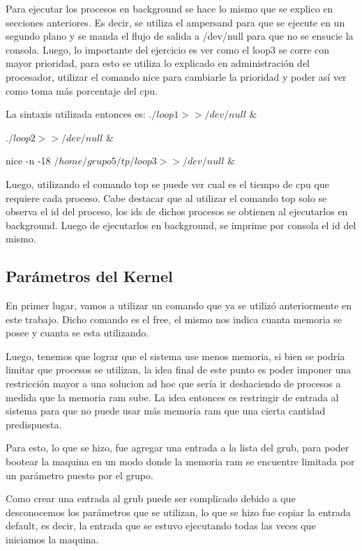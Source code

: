 \documentclass[a4paper, 12pt]{article}
\begin{document}
Para ejecutar los procesos en background se hace lo mismo que se explico en secciones anteriores. Es decir, se utiliza el ampersand para que se ejecute en un segundo plano y se manda el flujo de salida a /dev/null para que no se ensucie la consola. Luego, lo importante del ejercicio es ver como el loop3 se corre con mayor prioridad, para esto se utiliza lo explicado en administraci\'on del procesador, utilizar el comando nice para cambiarle la prioridad y poder as\'i ver como toma m\'as porcentaje del cpu.

La sintaxis utilizada entonces es:
$./loop1 >> /dev/null$ \&

$./loop2 >> /dev/null$ \&

nice -n -18 $/home/grupo5/tp/loop3 >> /dev/null$ \&


Luego, utilizando el comando top se puede ver cual es el tiempo de cpu que requiere cada proceso. Cabe destacar que al utilizar el comando top solo se observa el id del proceso, los ids de dichos procesos se obtienen al ejecutarlos en background. Luego de ejecutarlos en background, se imprime por consola el id del mismo.

\subsection*{Par\'ametros del Kernel}

En primer lugar, vamos a utilizar un comando que ya se utiliz\'o anteriormente en este trabajo. Dicho comando es el free, el mismo nos indica cuanta memoria se posee y cuanta se esta utilizando.

Luego, tenemos que lograr que el sistema use menos memoria, si bien se podr\'ia limitar que procesos se utilizan, la idea final de este punto es poder imponer una restricci\'on mayor a una solucion ad hoc que ser\'ia ir deshaciendo de procesos a medida que la memoria ram sube. La idea entonces es restringir de entrada al sistema para que no puede usar m\'as memoria ram que una cierta cantidad predispuesta.

Para esto, lo que se hizo, fue agregar una entrada a la lista del grub, para poder bootear la maquina en un modo donde la memoria ram se encuentre limitada por un par\'ametro puesto por el grupo.

Como crear una entrada al grub puede ser complicado debido a que desconocemos los par\'ametros que se utilizan, lo que se hizo fue copiar la entrada default, es decir, la entrada que se estuvo ejecutando todas las veces que iniciamos la maquina. 
\end{document}
